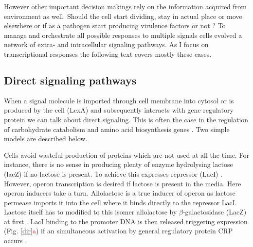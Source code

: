 However other important decision makings rely on the information acquired from environment as well.
Should the cell start dividing, stay in actual place or move elsewhere or if as a pathogen start producing virulence factors or not \cite{gottesman2003proteolysis, sourjik2012responding, cui2018novel}?
To manage and orchestrate all possible responses to multiple signals cells evolved a network of extra- and intracellular signaling pathways.
As I focus on transcriptional responses the following text covers mostly these cases.

\subsection{Direct signaling pathways}
When a signal molecule is imported through cell membrane into cytosol or is produced by the cell (LexA) and subsequently interacts with gene regulatory protein we can talk about direct signaling.
This is often the case in the regulation of carbohydrate catabolism and amino acid biosynthesis genes \cite{charlier1992arginine, weickert1992isorepressor, pittard1996various, wheatley2013structural}.
Two simple models are described below.

Cells avoid wasteful production of proteins which are not used at all the time.
For instance, there is no sense in producing plenty of enzyme hydrolysing lactose (lacZ) if no lactose is present.
To achieve this  expresses  repressor (LacI) \cite{hudson1990co}.
However,  operon transcription is desired if lactose is present in the media.
Here  operon inducers take a turn.
Allolactose is a true inducer of  operon as lactose permease imports it into the cell where it binds directly to the repressor LacI.
Lactose itself has to modified to this isomer allolactose by $\beta$-galactosidase (LacZ) at first \cite{jobe1972lac, wheatley2013structural}.
LacI binding to the promoter DNA is then released triggering  expression (Fig. \ref{dir}\textcolor{red}{a}) if an simultaneous activation by general regulatory protein CRP occurs \cite{hudson1990co, clark2005molecular}.

